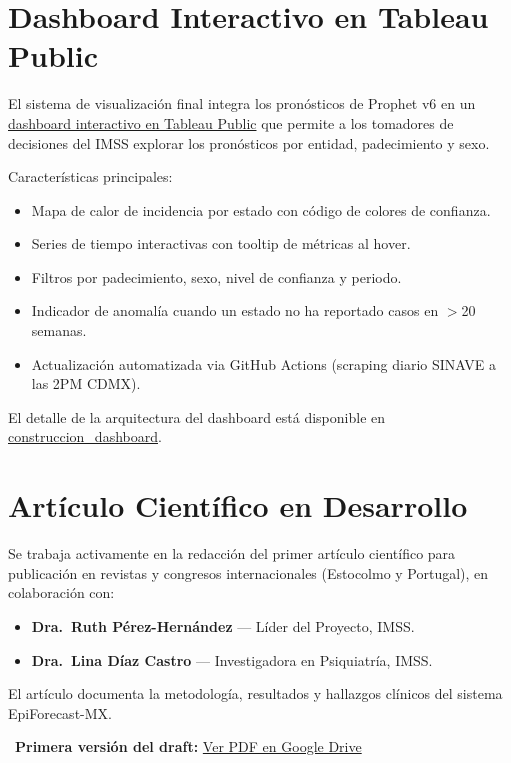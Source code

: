\documentclass[12pt, letterpaper]{article}
\begin{document}
\section{Dashboard Interactivo en Tableau Public}\label{sec:dashboard}

El sistema de visualización final integra los pronósticos de Prophet v6 en un \href{https://proyectointegrador.org/epidashboard}{dashboard interactivo en Tableau Public} que permite a los tomadores de decisiones del IMSS explorar los pronósticos por entidad, padecimiento y sexo.

Características principales:
\begin{itemize}[noitemsep]
    \item Mapa de calor de incidencia por estado con código de colores de confianza.
    \item Series de tiempo interactivas con tooltip de métricas al hover.
    \item Filtros por padecimiento, sexo, nivel de confianza y periodo.
    \item Indicador de anomalía cuando un estado no ha reportado casos en $>$20 semanas.
    \item Actualización automatizada via GitHub Actions (scraping diario SINAVE a las 2PM CDMX).
\end{itemize}

El detalle de la arquitectura del dashboard está disponible en \href{https://proyectointegrador.org/construccion_dashboard}{construccion\_dashboard}.


\section{Artículo Científico en Desarrollo}\label{sec:articulo}

\begin{tcolorbox}[colback=gold!5, colframe=gold, title={\textbf{Publicación académica en curso}}, fonttitle=\bfseries\color{white}]
Se trabaja activamente en la redacción del primer artículo científico para publicación en revistas y congresos internacionales (Estocolmo y Portugal), en colaboración con:
\begin{itemize}[noitemsep]
    \item \textbf{Dra.\ Ruth Pérez-Hernández} — Líder del Proyecto, IMSS.
    \item \textbf{Dra.\ Lina Díaz Castro} — Investigadora en Psiquiatría, IMSS.
\end{itemize}
El artículo documenta la metodología, resultados y hallazgos clínicos del sistema EpiForecast-MX.

\vspace{0.3cm}
\faFilePdf\ \textbf{Primera versión del draft:} \href{https://drive.google.com/file/d/12sp33RnvJk8gkCEwU1c1lXxbCqWjgpk9/view?usp=share_link}{Ver PDF en Google Drive}
\end{tcolorbox}
\end{document}
